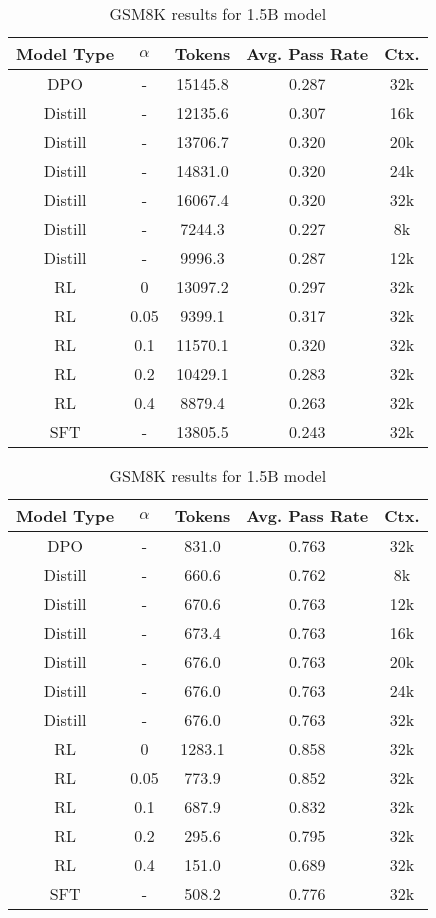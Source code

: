 \begin{center}
\begin{table}[h]
\caption{MATH500 results for 1.5B model}
\label{table:MATH500_1.5B}
\vspace{3em}
\begin{tabular}{ccccc}
\hline
\textbf{Model Type} & \textbf{$\alpha$} & \textbf{Tokens} & \textbf{Avg. Pass Rate} & \textbf{Ctx.} \\ \hline
DPO & - & 15145.8 & 0.287 & 32k \\
Distill & - & 12135.6 & 0.307 & 16k \\
Distill & - & 13706.7 & 0.320 & 20k \\
Distill & - & 14831.0 & 0.320 & 24k \\
Distill & - & 16067.4 & 0.320 & 32k \\
Distill & - & 7244.3 & 0.227 & 8k \\
Distill & - & 9996.3 & 0.287 & 12k \\
RL & 0 & 13097.2 & 0.297 & 32k \\
RL & 0.05 & 9399.1 & 0.317 & 32k \\
RL & 0.1 & 11570.1 & 0.320 & 32k \\
RL & 0.2 & 10429.1 & 0.283 & 32k \\
RL & 0.4 & 8879.4 & 0.263 & 32k \\
SFT & - & 13805.5 & 0.243 & 32k\\
\hline
\end{tabular}


\caption{AIME results for 1.5B model}
\label{table:AIME_1.5B}

\vspace{2.5em}
\begin{tabular}{ccccc}
\hline
\textbf{Model Type} & \textbf{$\alpha$} & \textbf{Tokens} & \textbf{Avg. Pass Rate} & \textbf{Ctx.} \\ \hline
DPO & - & 831.0 & 0.763 & 32k \\
Distill & - & 660.6 & 0.762 & 8k \\
Distill & - & 670.6 & 0.763 & 12k \\
Distill & - & 673.4 & 0.763 & 16k \\
Distill & - & 676.0 & 0.763 & 20k \\
Distill & - & 676.0 & 0.763 & 24k \\
Distill & - & 676.0 & 0.763 & 32k \\
RL & 0 & 1283.1 & 0.858 & 32k \\
RL & 0.05 & 773.9 & 0.852 & 32k \\
RL & 0.1 & 687.9 & 0.832 & 32k \\
RL & 0.2 & 295.6 & 0.795 & 32k \\
RL & 0.4 & 151.0 & 0.689 & 32k \\
SFT & - & 508.2 & 0.776 & 32k\\
\hline
\end{tabular}

\caption{GSM8K results for 1.5B model}
\label{table:GSM8K_1.5B}

\end{table}
\end{center}


